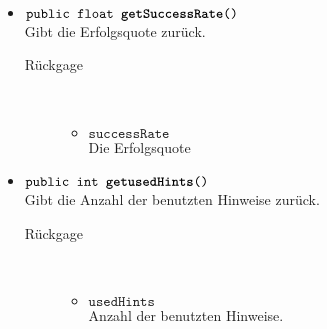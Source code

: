 \begin{description}
\begin{itemize}
			
			\item $\texttt{public  float \textbf{getSuccessRate}()}$ \\ Gibt die Erfolgsquote zurück.
				\begin{description}
				\item[Rückgage] \hfill \\
					\vspace{-.8cm}
					\begin{itemize}
						\item $\texttt{successRate }$ \\ Die Erfolgsquote 
					\end{itemize}	
					\end{description}
			
\item $\texttt{public  int \textbf{getusedHints}()}$ \\ Gibt die Anzahl der benutzten Hinweise zurück.
				\begin{description}
				\item[Rückgage] \hfill \\
					\vspace{-.8cm}
					\begin{itemize}
						\item $\texttt{usedHints }$ \\ Anzahl der benutzten Hinweise.
					\end{itemize}	
					\end{description}
					

\end{itemize}
\end{description}
